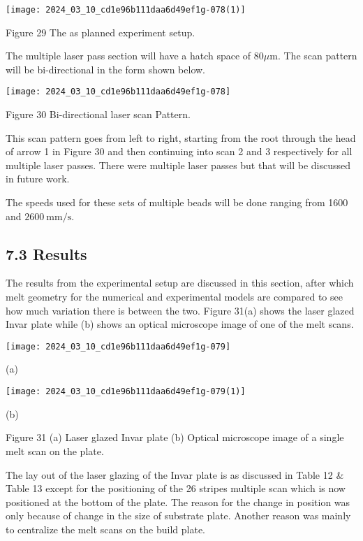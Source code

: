\documentclass[10pt]{article}
\begin{document}
\begin{center}
\texttt{[image: 2024\_03\_10\_cd1e96b111daa6d49ef1g-078(1)]}
\end{center}

Figure 29 The as planned experiment setup.

The multiple laser pass section will have a hatch space of $80 \mu \mathrm{m}$. The scan pattern will be bi-directional in the form shown below.

\begin{center}
\texttt{[image: 2024\_03\_10\_cd1e96b111daa6d49ef1g-078]}
\end{center}

Figure 30 Bi-directional laser scan Pattern.

This scan pattern goes from left to right, starting from the root through the head of arrow 1 in Figure 30 and then continuing into scan 2 and 3 respectively for all multiple laser passes. There were multiple laser passes but that will be discussed in future work.

The speeds used for these sets of multiple beads will be done ranging from 1600 and $2600 \mathrm{~mm} / \mathrm{s}$.

\subsection*{7.3 Results}
The results from the experimental setup are discussed in this section, after which melt geometry for the numerical and experimental models are compared to see how much variation there is between the two. Figure 31(a) shows the laser glazed Invar plate while (b) shows an optical microscope image of one of the melt scans.

\begin{center}
\texttt{[image: 2024\_03\_10\_cd1e96b111daa6d49ef1g-079]}
\end{center}

(a)

\begin{center}
\texttt{[image: 2024\_03\_10\_cd1e96b111daa6d49ef1g-079(1)]}
\end{center}

(b)

Figure 31 (a) Laser glazed Invar plate (b) Optical microscope image of a single melt scan on the plate.

The lay out of the laser glazing of the Invar plate is as discussed in Table 12 \& Table 13 except for the positioning of the 26 stripes multiple scan which is now positioned at the bottom of the plate. The reason for the change in position was only because of change in the size of substrate plate. Another reason was mainly to centralize the melt scans on the build plate.
\end{document}

